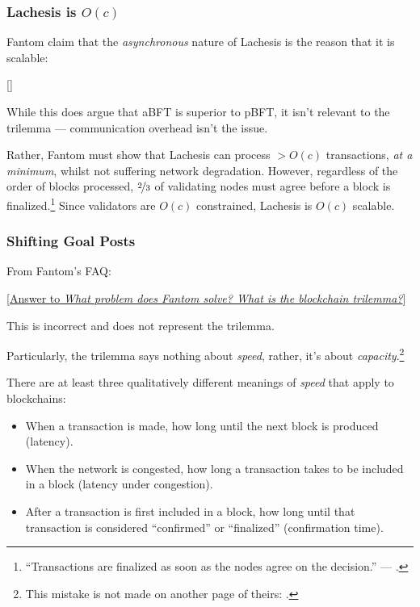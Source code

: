\subsubsection{Lachesis is $O(c)$}

Fantom claim that the \emph{asynchronous} nature of Lachesis is the reason that it is scalable:

[{\citeFantomLachesis}]

While this does argue that aBFT is superior to pBFT, it isn't relevant to the trilemma --- communication overhead isn't the issue.

Rather, Fantom must show that Lachesis can process $> O(c)$ transactions, \emph{at a minimum}, whilst not suffering network degradation.
However, regardless of the order of blocks processed, $\nicefrac{2}{3}$ of validating nodes must agree before a block is finalized.\footnote{
    ``Transactions are finalized as soon as the nodes agree on the decision.'' --- \citeFantomLachesis.
}
Since validators are $O(c)$ constrained, Lachesis is $O(c)$ scalable.


\subsubsection{Shifting Goal Posts}

From Fantom's FAQ:

[{\href{\linkFantomFaq}{Answer to \emph{What problem does Fantom solve? What is the blockchain trilemma?}}}]

This is incorrect and does not represent the trilemma.

Particularly, the trilemma says nothing about \emph{speed}, rather, it's about \emph{capacity}.\footnote{
    This mistake is not made on another page of theirs: \citeFantomLachesis.
}

There are at least three qualitatively different meanings of \emph{speed} that apply to blockchains:

\begin{itemize}
    \item When a transaction is made, how long until the next block is produced (latency).
    \item When the network is congested, how long a transaction takes to be included in a block (latency under congestion).
    \item After a transaction is first included in a block, how long until that transaction is considered ``confirmed'' or ``finalized'' (confirmation time).
\end{itemize}

